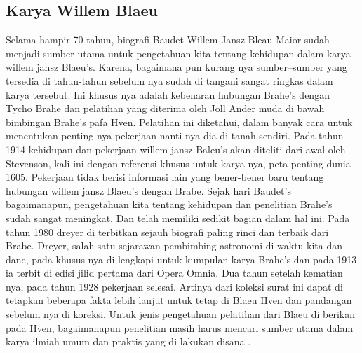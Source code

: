 \subsection{Karya Willem Blaeu}
Selama hampir 70 tahun, biografi Baudet Willem Jansz Bleau Maior sudah menjadi sumber utama untuk pengetahuan kita 
tentang kehidupan dalam karya willem jansz Blaeu's. Karena, bagaimana pun kurang nya sumber–sumber yang tersedia di tahun-tahun 
sebelum nya sudah di tangani sangat ringkas dalam karya tersebut. 
Ini khusus nya adalah kebenaran hubungan Brahe's dengan Tycho Brahe dan pelatihan yang diterima oleh Joll Ander muda di bawah bimbingan Brahe's pafa Hven. 
Pelatihan ini diketahui, dalam banyak cara untuk menentukan penting nya pekerjaan nanti nya dia di tanah sendiri. 
Pada tahun 1914 kehidupan dan pekerjaan willem jansz Baleu's akan diteliti dari awal oleh Stevenson, 
kali ini dengan referensi khusus untuk karya nya, peta penting dunia 1605. Pekerjaan tidak berisi informasi lain yang bener-bener 
baru tentang hubungan willem jansz Blaeu's dengan Brabe. Sejak hari Baudet's bagaimanapun, 
pengetahuan kita tentang kehidupan dan penelitian Brahe's sudah sangat meningkat. 
Dan telah memiliki sedikit bagian dalam hal ini. Pada tahun 1980 dreyer di terbitkan sejauh biografi paling rinci dan terbaik dari Brabe.  
Dreyer, salah satu sejarawan pembimbing astronomi di waktu kita dan dane, 
pada khusus nya di lengkapi untuk kumpulan karya Brahe's dan pada 1913 ia terbit di edisi jilid pertama dari Opera Omnia. 
Dua tahun setelah kematian nya, pada tahun 1928 pekerjaan selesai. 
Artinya dari koleksi surat ini dapat di tetapkan beberapa fakta lebih lanjut untuk tetap di Blaeu Hven dan pandangan sebelum nya di koreksi. 
Untuk jenis pengetahuan pelatihan dari Blaeu  di berikan pada Hven,
bagaimanapun penelitian masih harus mencari sumber utama dalam karya ilmiah umum dan praktis yang di lakukan disana \cite{richter1939willem}.


